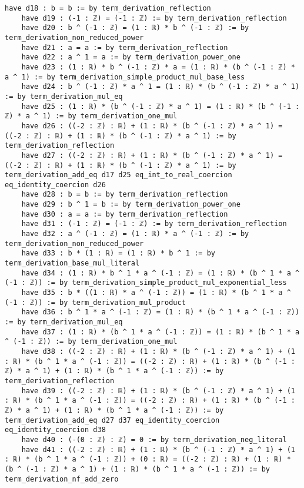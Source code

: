 \documentclass{article}
\begin{document}
\begin{tcolorbox}[colback=white!10, width=\linewidth]
\begin{lstlisting}[language=Lean4]
    have d18 : b = b := by term_derivation_reflection
    have d19 : (-1 : ℤ) = (-1 : ℤ) := by term_derivation_reflection
    have d20 : b ^ (-1 : ℤ) = (1 : ℝ) * b ^ (-1 : ℤ) := by term_derivation_non_reduced_power
    have d21 : a = a := by term_derivation_reflection
    have d22 : a ^ 1 = a := by term_derivation_power_one
    have d23 : (1 : ℝ) * b ^ (-1 : ℤ) * a = (1 : ℝ) * (b ^ (-1 : ℤ) * a ^ 1) := by term_derivation_simple_product_mul_base_less
    have d24 : b ^ (-1 : ℤ) * a ^ 1 = (1 : ℝ) * (b ^ (-1 : ℤ) * a ^ 1) := by term_derivation_mul_eq
    have d25 : (1 : ℝ) * (b ^ (-1 : ℤ) * a ^ 1) = (1 : ℝ) * (b ^ (-1 : ℤ) * a ^ 1) := by term_derivation_one_mul
    have d26 : ((-2 : ℤ) : ℝ) + (1 : ℝ) * (b ^ (-1 : ℤ) * a ^ 1) = ((-2 : ℤ) : ℝ) + (1 : ℝ) * (b ^ (-1 : ℤ) * a ^ 1) := by term_derivation_reflection
    have d27 : ((-2 : ℤ) : ℝ) + (1 : ℝ) * (b ^ (-1 : ℤ) * a ^ 1) = ((-2 : ℤ) : ℝ) + (1 : ℝ) * (b ^ (-1 : ℤ) * a ^ 1) := by term_derivation_add_eq d17 d25 eq_int_to_real_coercion eq_identity_coercion d26
    have d28 : b = b := by term_derivation_reflection
    have d29 : b ^ 1 = b := by term_derivation_power_one
    have d30 : a = a := by term_derivation_reflection
    have d31 : (-1 : ℤ) = (-1 : ℤ) := by term_derivation_reflection
    have d32 : a ^ (-1 : ℤ) = (1 : ℝ) * a ^ (-1 : ℤ) := by term_derivation_non_reduced_power
    have d33 : b * (1 : ℝ) = (1 : ℝ) * b ^ 1 := by term_derivation_base_mul_literal
    have d34 : (1 : ℝ) * b ^ 1 * a ^ (-1 : ℤ) = (1 : ℝ) * (b ^ 1 * a ^ (-1 : ℤ)) := by term_derivation_simple_product_mul_exponential_less
    have d35 : b * ((1 : ℝ) * a ^ (-1 : ℤ)) = (1 : ℝ) * (b ^ 1 * a ^ (-1 : ℤ)) := by term_derivation_mul_product
    have d36 : b ^ 1 * a ^ (-1 : ℤ) = (1 : ℝ) * (b ^ 1 * a ^ (-1 : ℤ)) := by term_derivation_mul_eq
    have d37 : (1 : ℝ) * (b ^ 1 * a ^ (-1 : ℤ)) = (1 : ℝ) * (b ^ 1 * a ^ (-1 : ℤ)) := by term_derivation_one_mul
    have d38 : ((-2 : ℤ) : ℝ) + (1 : ℝ) * (b ^ (-1 : ℤ) * a ^ 1) + (1 : ℝ) * (b ^ 1 * a ^ (-1 : ℤ)) = ((-2 : ℤ) : ℝ) + (1 : ℝ) * (b ^ (-1 : ℤ) * a ^ 1) + (1 : ℝ) * (b ^ 1 * a ^ (-1 : ℤ)) := by term_derivation_reflection
    have d39 : ((-2 : ℤ) : ℝ) + (1 : ℝ) * (b ^ (-1 : ℤ) * a ^ 1) + (1 : ℝ) * (b ^ 1 * a ^ (-1 : ℤ)) = ((-2 : ℤ) : ℝ) + (1 : ℝ) * (b ^ (-1 : ℤ) * a ^ 1) + (1 : ℝ) * (b ^ 1 * a ^ (-1 : ℤ)) := by term_derivation_add_eq d27 d37 eq_identity_coercion eq_identity_coercion d38
    have d40 : (-(0 : ℤ) : ℤ) = 0 := by term_derivation_neg_literal
    have d41 : ((-2 : ℤ) : ℝ) + (1 : ℝ) * (b ^ (-1 : ℤ) * a ^ 1) + (1 : ℝ) * (b ^ 1 * a ^ (-1 : ℤ)) + (0 : ℝ) = ((-2 : ℤ) : ℝ) + (1 : ℝ) * (b ^ (-1 : ℤ) * a ^ 1) + (1 : ℝ) * (b ^ 1 * a ^ (-1 : ℤ)) := by term_derivation_nf_add_zero

\end{lstlisting}
\end{tcolorbox}
\end{document}
